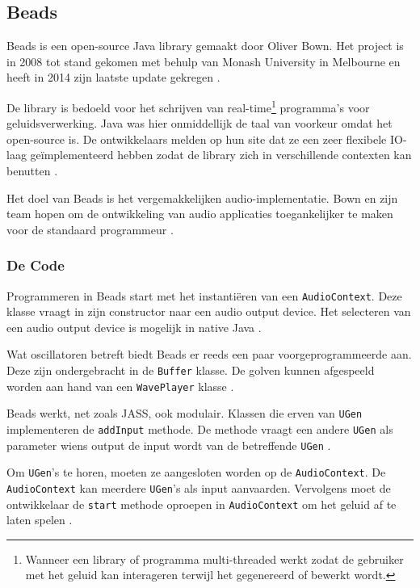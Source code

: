 \subsection{Beads}

Beads is een open-source Java library gemaakt door Oliver Bown. Het project is in 2008 tot stand gekomen met behulp van Monash University in Melbourne en heeft in 2014 zijn laatste update gekregen \autocite{beads}.

De library is bedoeld voor het schrijven van real-time\footnote{Wanneer een library of programma multi-threaded werkt zodat de gebruiker met het geluid kan interageren terwijl het gegenereerd of bewerkt wordt.} programma's voor geluidsverwerking. Java was hier onmiddellijk de taal van voorkeur omdat het open-source is. De ontwikkelaars melden op hun site dat ze een zeer flexibele IO-laag geïmplementeerd hebben zodat de library zich in verschillende contexten kan benutten \autocite{beads}. 

Het doel van Beads is het vergemakkelijken audio-implementatie. Bown en zijn team hopen om de ontwikkeling van audio applicaties toegankelijker te maken voor de standaard programmeur \autocite{beads2}.

\subsubsection*{De Code}

Programmeren in Beads start met het instantiëren van een \verb+AudioContext+. Deze klasse vraagt in zijn constructor naar een audio output device. Het selecteren van een audio output device is mogelijk in native Java \autocite{beadsdocs}.

Wat oscillatoren betreft biedt Beads er reeds een paar voorgeprogrammeerde aan. Deze zijn ondergebracht in de \verb+Buffer+ klasse. De golven kunnen afgespeeld worden aan hand van een \verb+WavePlayer+ klasse \autocite{beadsdocs}.

Beads werkt, net zoals JASS, ook modulair. Klassen die erven van \verb+UGen+ implementeren de \verb+addInput+ methode. De methode vraagt een andere \verb+UGen+ als parameter wiens output de input wordt van de betreffende \verb+UGen+ \autocite{beadsdocs}.

Om \verb+UGen+'s te horen, moeten ze aangesloten worden op de \verb+AudioContext+. De \verb+AudioContext+ kan meerdere \verb+UGen+'s als input aanvaarden. Vervolgens moet de ontwikkelaar de \verb+start+ methode oproepen in \verb+AudioContext+ om het geluid af te laten spelen \autocite{beadsdocs}.

